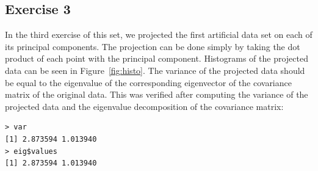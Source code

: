 \documentclass{article}
\begin{document}
\subsection{Exercise 3}
In the third exercise of this set, we projected the first artificial data
set on each of its principal components. The projection can be done simply
by taking the dot product of each point with the principal component. Histograms of the
projected data can be seen in Figure~\ref{fig:histo}. The variance of
the projected data should be equal to the eigenvalue of the
corresponding eigenvector of the covariance matrix of the original
data. This was verified after computing the variance of the projected
data and the eigenvalue decomposition of the covariance matrix:
\begin{verbatim}
> var
[1] 2.873594 1.013940
> eig$values
[1] 2.873594 1.013940
\end{verbatim}
\end{document}
